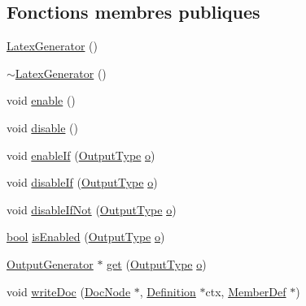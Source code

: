 \subsection*{Fonctions membres publiques}
\begin{DoxyCompactItemize}
\item 
\hyperlink{class_latex_generator_ae145cddfcb7ce9a667be80989bc6f865}{Latex\+Generator} ()
\item 
\hyperlink{class_latex_generator_a41eb1f6954f59427c7eeb483df39cdec}{$\sim$\+Latex\+Generator} ()
\item 
void \hyperlink{class_latex_generator_a908ea4d8fe8f25df93dd7e62e8dcdaaa}{enable} ()
\item 
void \hyperlink{class_latex_generator_a289220be2f2fd7ce0796d223c975f5d7}{disable} ()
\item 
void \hyperlink{class_latex_generator_a52aa0664e4c94c3ec080a4f89a5ac001}{enable\+If} (\hyperlink{class_output_generator_ab79b5d3c19d95c8a5929c07f5b2918cf}{Output\+Type} \hyperlink{060__command__switch_8tcl_a495e7a4ede0831107e9d435080a7c268}{o})
\item 
void \hyperlink{class_latex_generator_a58b8a5cb3f4030d219a4e0ecd4861e23}{disable\+If} (\hyperlink{class_output_generator_ab79b5d3c19d95c8a5929c07f5b2918cf}{Output\+Type} \hyperlink{060__command__switch_8tcl_a495e7a4ede0831107e9d435080a7c268}{o})
\item 
void \hyperlink{class_latex_generator_aab82db46a5d5e0c2ffdbbc97c75bd742}{disable\+If\+Not} (\hyperlink{class_output_generator_ab79b5d3c19d95c8a5929c07f5b2918cf}{Output\+Type} \hyperlink{060__command__switch_8tcl_a495e7a4ede0831107e9d435080a7c268}{o})
\item 
\hyperlink{qglobal_8h_a1062901a7428fdd9c7f180f5e01ea056}{bool} \hyperlink{class_latex_generator_ac772a07025c6fa4affeb9fd0e3c5033c}{is\+Enabled} (\hyperlink{class_output_generator_ab79b5d3c19d95c8a5929c07f5b2918cf}{Output\+Type} \hyperlink{060__command__switch_8tcl_a495e7a4ede0831107e9d435080a7c268}{o})
\item 
\hyperlink{class_output_generator}{Output\+Generator} $\ast$ \hyperlink{class_latex_generator_aa2afcbb2b9455fa24d37a27d6e705d76}{get} (\hyperlink{class_output_generator_ab79b5d3c19d95c8a5929c07f5b2918cf}{Output\+Type} \hyperlink{060__command__switch_8tcl_a495e7a4ede0831107e9d435080a7c268}{o})
\item 
void \hyperlink{class_latex_generator_a450603f1d10ea9800c40f7b1fb4d97bf}{write\+Doc} (\hyperlink{class_doc_node}{Doc\+Node} $\ast$, \hyperlink{class_definition}{Definition} $\ast$ctx, \hyperlink{class_member_def}{Member\+Def} $\ast$)

\end{DoxyCompactItemize}
